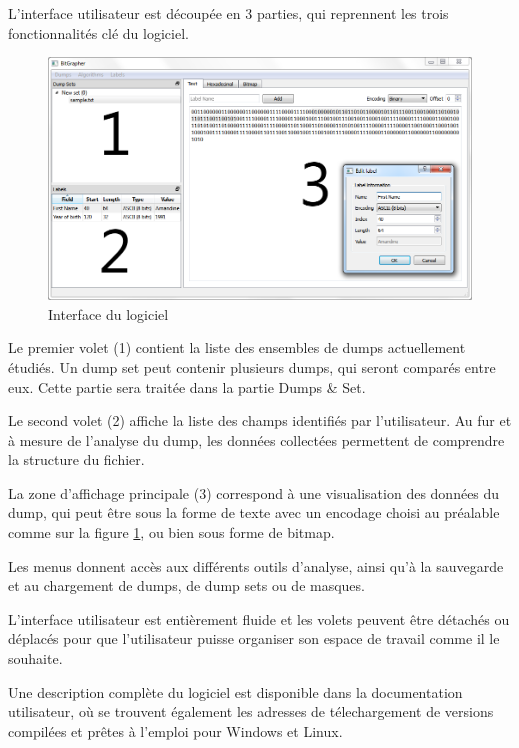 L'interface utilisateur est découpée en 3 parties, qui reprennent les trois fonctionnalités clé du logiciel.

\begin{figure}[!h]
  \begin{center}
  \includegraphics[width=\textwidth]{interface.png}
  \caption{Interface du logiciel}
  \label{interface}
  \end{center}
\end{figure}

Le premier volet (1) contient la liste des ensembles de dumps actuellement étudiés. Un dump set peut contenir plusieurs dumps, qui seront comparés entre eux. Cette partie sera traitée dans la partie Dumps & Set.

Le second volet (2) affiche la liste des champs identifiés par l'utilisateur. Au fur et à mesure de l'analyse du dump, les données collectées permettent de comprendre la structure du fichier.

La zone d'affichage principale (3) correspond à une visualisation des données du dump, qui peut être sous la forme de texte avec un encodage choisi au préalable comme sur la figure \ref{interface}, ou bien sous forme de bitmap.

Les menus donnent accès aux différents outils d'analyse, ainsi qu'à la sauvegarde et au chargement de dumps, de dump sets ou de masques.

L'interface utilisateur est entièrement fluide et les volets peuvent être détachés ou déplacés pour que l'utilisateur puisse organiser son espace de travail comme il le souhaite.

Une description complète du logiciel est disponible dans la documentation utilisateur, où se trouvent également les adresses de télechargement de versions compilées et prêtes à l'emploi pour Windows et Linux.
